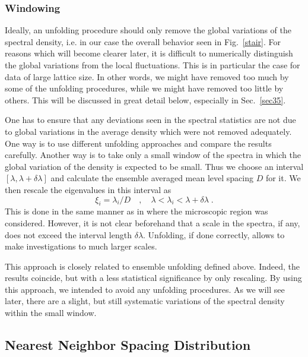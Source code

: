 \subsubsection{Windowing}
\label{sec313}
Ideally, an unfolding procedure should only remove the global
variations of the spectral density, i.e. in our case the overall
behavior seen in Fig.~\ref{stair}. For reasons which will become
clearer later, it is difficult to numerically distinguish the global
variations from the local fluctuations. This is in particular the case
for data of large lattice size.  In other words, we might have removed
too much by some of the unfolding procedures, while we might have
removed too little by others. This will be discussed in great detail
below, especially in Sec.~\ref{sec35}.

One has to ensure that any deviations seen in the spectral statistics
are not due to global variations in the average density which were not
removed adequately. One way is to use different unfolding approaches
and compare the results carefully. Another way is to take only a small
window of the spectra in which the global variation of the density is
expected to be small.  Thus we choose an interval
$[\lambda,\lambda+\delta\lambda]$ and calculate the ensemble averaged
mean level spacing $D$ for it. We then rescale the eigenvalues in this
interval as
\begin{equation}
\xi_i=\lambda_i/D\quad,\quad
\lambda<\lambda_i<\lambda+\delta\lambda\;.
\end{equation}
This is done in the same manner as in \cite{ma97} where the
microscopic region was considered. However, it is not clear beforehand
that a scale in the spectra, if any, does not exceed the interval
length $\delta\lambda$. Unfolding, if done correctly, allows to make
investigations to much larger scales.

This approach is closely related to ensemble unfolding defined above.
Indeed, the results coincide, but with a less statistical significance
by only rescaling.  By using this approach, we intended to avoid any
unfolding procedures. As we will see later, there are a slight, but
still systematic variations of the spectral density within the small
window.

\subsection{Nearest Neighbor Spacing Distribution}
\label{sec32}

